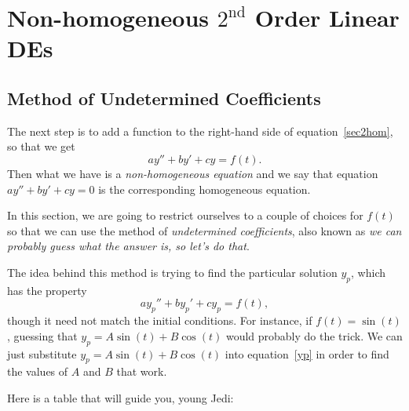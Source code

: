 \documentclass[10pt,driverfallback=hypertex]{report}
\newcounter{small}
\begin{document}
\chapter{Non-homogeneous $2^{\text{nd}}$ Order Linear DEs}

\section{Method of Undetermined Coefficients}
The next step is to add a function to the right-hand side of
equation~\eqref{sec2hom}, so that we get
\begin{dmath*}
  a y'' + b y' + cy =f(t).
\end{dmath*}
Then what we have is a \emph{non-homogeneous equation} and we say that
equation $a y'' + b y' + cy =0$ is the corresponding homogeneous
equation.

In this section, we are going to restrict ourselves to a couple of
choices for $f(t)$ so that we can use the method of \emph{undetermined
  coefficients}, also known as \emph{we can probably guess what the
  answer is, so let's do that}.

The idea behind this method is trying to find the particular solution $y_p$,
which has the property
\begin{dmath} 
  \label{yp}
  a y_p'' + b y_p' + cy_p =f(t),
\end{dmath}
though it need not match the initial conditions. For instance, if
$f(t)=\sin(t)$, guessing that $y_p = A \sin(t) + B \cos(t)$ would probably do
the trick. We can just substitute $y_p = A \sin(t) + B \cos(t)$ into equation~\eqref{yp} in order to find the values of $A$ and $B$ that work.

Here is a table that will guide you, young Jedi:
\end{document}
